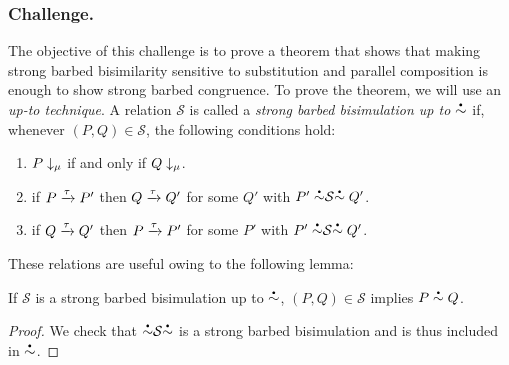 \subsubsection{Challenge.}
The objective of this challenge is to prove a theorem that shows that
making strong barbed bisimilarity sensitive to substitution and
parallel composition is enough to show strong barbed
congruence.
To prove the theorem, we will use an \emph{up-to technique}.
A relation \( \mathcal{S} \) is called a \emph{strong barbed bisimulation up to \( \sbbisim{}{} \)} if, whenever \( (P,Q) \in \mathcal{S} \), the following conditions hold:
\begin{enumerate}
\item \( P\downarrow_{\mu} \) if and only if \( Q\downarrow_{\mu} \).
\item if \( P \xrightarrow{\tau} P' \) then \( Q \xrightarrow{\tau} Q' \) for some \( Q' \) with \( \uptosbb{P'}{\mathcal{S}}{Q'} \).
\item if \( Q \xrightarrow{\tau} Q' \) then \( P \xrightarrow{\tau} P' \) for some \( P' \) with \( \uptosbb{P'}{\mathcal{S}}{Q'} \).
\end{enumerate}
These relations are useful owing to the following lemma:
\begin{lemma}\label{lemma:up-to}
  If \( \mathcal{S} \) is a strong barbed bisimulation up to \( \sbbisim{}{} \), \( (P,Q) \in \mathcal{S} \) implies \( \sbbisim{P}{Q} \).
\end{lemma}
\begin{proof}
  We check that \( \uptosbb{}{\mathcal{S}}{} \) is a strong barbed bisimulation and is thus included in \( \sbbisim{}{} \).
\end{proof}

